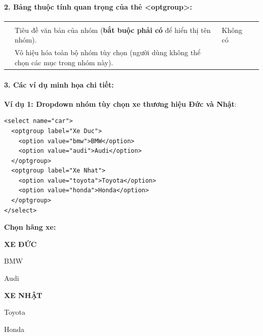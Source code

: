 \paragraph{2. Bảng thuộc tính quan trọng của thẻ <optgroup>:}

\begin{prettyTableBox}
\begin{tabularx}{\linewidth}{K{2.2cm} Z K{2.5cm} Z}
 &  &  &  \\
 & Tiêu đề văn bản của nhóm (\textbf{bắt buộc phải có} để hiển thị tên nhóm). & Không có &  \\
 & Vô hiệu hóa toàn bộ nhóm tùy chọn (người dùng không thể chọn các mục trong nhóm này). &  &  \\
\end{tabularx}
\end{prettyTableBox}

\paragraph{3. Các ví dụ minh họa chi tiết:}

\textbf{Ví dụ 1: Dropdown nhóm tùy chọn xe thương hiệu Đức và Nhật}:
\begin{codeWindow}
\begin{lstlisting}[language=HTML5]
<select name="car">
  <optgroup label="Xe Duc">
    <option value="bmw">BMW</option>
    <option value="audi">Audi</option>
  </optgroup>
  <optgroup label="Xe Nhat">
    <option value="toyota">Toyota</option>
    <option value="honda">Honda</option>
  </optgroup>
</select>
\end{lstlisting}
\end{codeWindow}

\begin{browserWindow}
\sffamily\small
\textbf{Chọn hãng xe:} \par\vspace{4pt}
\begin{tcolorbox}[arc=2pt, colback=white, colframe=primaryBlue!50, boxsep=4pt, width=0.6\linewidth]
  \small
  \textbf{\textcolor{gray!80}{XE ĐỨC}} \par\vspace{2pt}
  \quad BMW \par\vspace{2pt}
  \quad Audi \par\vspace{3pt}
  \textbf{\textcolor{gray!80}{XE NHẬT}} \par\vspace{2pt}
  \quad Toyota \par\vspace{2pt}
  \quad Honda
\end{tcolorbox}
\end{browserWindow}

